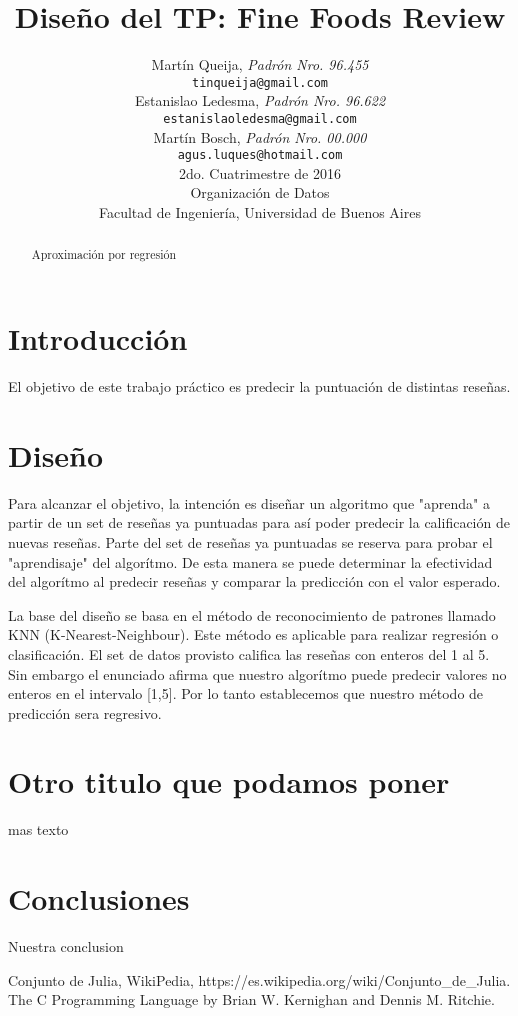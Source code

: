 \documentclass[a4paper,10pt]{article}
\title{		\textbf{Diseño del TP: Fine Foods Review}}
\author{	Martín Queija, \textit{Padrón Nro. 96.455}                     \\
            \texttt{ tinqueija@gmail.com }                                              \\[2.5ex]
            Estanislao Ledesma, \textit{Padrón Nro. 96.622}                     \\
            \texttt{ estanislaoledesma@gmail.com }                                              \\[2.5ex]
            Martín Bosch, \textit{Padrón Nro. 00.000}                     \\
            \texttt{ agus.luques@hotmail.com }                                              \\[2.5ex]
            \normalsize{2do. Cuatrimestre de 2016}                                      \\
            \normalsize{Organización de Datos  }  \\
            \normalsize{Facultad de Ingeniería, Universidad de Buenos Aires}            \\
       }
\date{}
\begin{document}
\maketitle
\thispagestyle{empty}   %


\begin{abstract}
\centerline{Aproximación por regresión}

\end{abstract}
\newpage

\tableofcontents


\section{Introducción}

El objetivo de este trabajo práctico es predecir la puntuación de distintas reseñas.

\section{Diseño}

Para alcanzar el objetivo, la intención es diseñar un algoritmo que "aprenda" a partir de un set de reseñas ya puntuadas para así poder predecir la calificación de nuevas reseñas. Parte del set de reseñas ya puntuadas se reserva para probar el "aprendisaje" del algorítmo. De esta manera se puede determinar la efectividad del algorítmo al predecir reseñas y comparar la predicción con el valor esperado.

La base del diseño se basa en el método de reconocimiento de patrones llamado KNN (K-Nearest-Neighbour). Este método es aplicable para realizar regresión o clasificación. El set de datos provisto califica las reseñas con enteros del 1 al 5. Sin embargo el enunciado afirma que nuestro algorítmo puede predecir valores no enteros en el intervalo [1,5]. Por lo tanto establecemos que nuestro método de predicción sera regresivo.

\section{Otro titulo que podamos poner}

mas texto

\section{Conclusiones}

Nuestra conclusion

\begin{thebibliography}{99}

 Conjunto de Julia, WikiPedia, https://es.wikipedia.org/wiki/Conjunto\_de\_Julia.
 The C Programming Language by Brian W. Kernighan and Dennis M. Ritchie.

\end{thebibliography}
\end{document}
